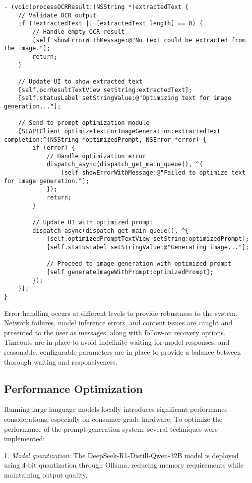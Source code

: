 \begin{verbatim}
- (void)processOCRResult:(NSString *)extractedText {
    // Validate OCR output
    if (!extractedText || [extractedText length] == 0) {
        // Handle empty OCR result
        [self showErrorWithMessage:@"No text could be extracted from the image."];
        return;
    }
    
    // Update UI to show extracted text
    [self.ocrResultTextView setString:extractedText];
    [self.statusLabel setStringValue:@"Optimizing text for image generation..."];
    
    // Send to prompt optimization module
    [SLAPIClient optimizeTextForImageGeneration:extractedText completion:^(NSString *optimizedPrompt, NSError *error) {
        if (error) {
            // Handle optimization error
            dispatch_async(dispatch_get_main_queue(), ^{
                [self showErrorWithMessage:@"Failed to optimize text for image generation."];
            });
            return;
        }
        
        // Update UI with optimized prompt
        dispatch_async(dispatch_get_main_queue(), ^{
            [self.optimizedPromptTextView setString:optimizedPrompt];
            [self.statusLabel setStringValue:@"Generating image..."];
            
            // Proceed to image generation with optimized prompt
            [self generateImageWithPrompt:optimizedPrompt];
        });
    }];
}
\end{verbatim}

Error handling occurs at different levels to provide robustness to the system. Network failures, model inference errors, and content issues are caught and presented to the user as messages, along with follow-on recovery options. Timeouts are in place to avoid indefinite waiting for model responses, and reasonable, configurable parameters are in place to provide a balance between thorough waiting and responsiveness.


\subsection{Performance Optimization}

Running large language models locally introduces significant performance considerations, especially on consumer-grade hardware. To optimize the performance of the prompt generation system, several techniques were implemented:


1. \textit{Model quantization}: The DeepSeek-R1-Distill-Qwen-32B model is deployed using 4-bit quantization through Ollama, reducing memory requirements while maintaining output quality.



